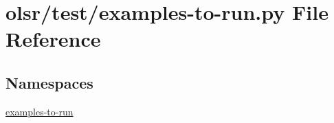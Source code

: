 \hypertarget{olsr_2test_2examples-to-run_8py}{}\section{olsr/test/examples-\/to-\/run.py File Reference}
\label{olsr_2test_2examples-to-run_8py}
\subsection*{Namespaces}
\begin{DoxyCompactItemize}
\item 
 \hyperlink{namespaceexamples-to-run}{examples-\/to-\/run}
\end{DoxyCompactItemize}
